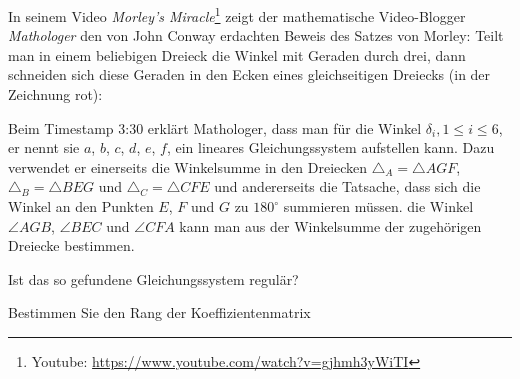 In seinem Video {\em Morley's Miracle}\footnote{Youtube: \url{https://www.youtube.com/watch?v=gjhmh3yWiTI}}
zeigt der mathematische Video-Blogger
{\em Mathologer} den von John Conway erdachten Beweis des Satzes von Morley:
Teilt man in einem beliebigen Dreieck die Winkel mit Geraden durch drei, dann
schneiden sich diese Geraden in den Ecken eines gleichseitigen Dreiecks
(in der Zeichnung rot):
\begin{center}
\end{center}
Beim Timestamp 3:30 erklärt Mathologer, dass man für die Winkel
$\delta_i,1\le i\le 6$, er nennt sie $a$, $b$, $c$, $d$, $e$, $f$, ein
lineares Gleichungssystem aufstellen kann. 
Dazu verwendet er einerseits die Winkelsumme in den Dreiecken
$\triangle_A=\triangle AGF$,
$\triangle_B=\triangle BEG$ und $\triangle_C=\triangle CFE$
und andererseits die Tatsache, dass sich die
Winkel an den Punkten $E$, $F$ und $G$ zu $180^\circ$ summieren müssen.
die Winkel $\angle AGB$, $\angle BEC$ und $\angle CFA$ kann man aus
der Winkelsumme der zugehörigen Dreiecke bestimmen.
\begin{teilaufgaben}
\item
Ist das so gefundene Gleichungssystem regulär?
\item
Bestimmen Sie den Rang der Koeffizientenmatrix
\end{teilaufgaben}


